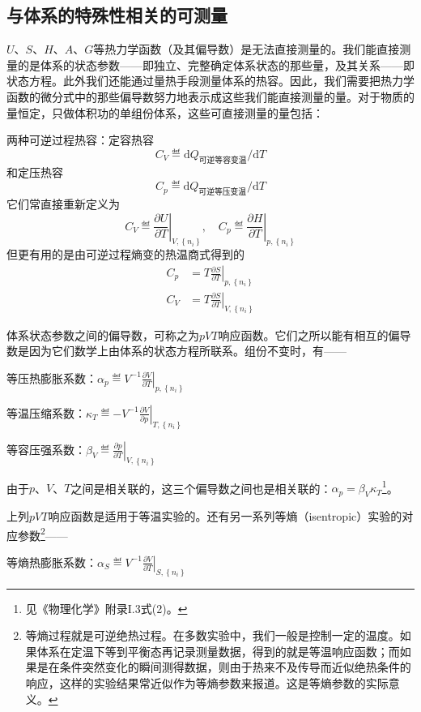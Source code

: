 \documentclass[main.tex]{subfiles}
\begin{document}
\subsection{与体系的特殊性相关的可测量}
$U$、$S$、$H$、$A$、$G$等热力学函数（及其偏导数）是无法直接测量的。我们能直接测量的是体系的状态参数——即独立、完整确定体系状态的那些量，及其关系——即状态方程。此外我们还能通过量热手段测量体系的热容。因此，我们需要把热力学函数的微分式中的那些偏导数努力地表示成这些我们能直接测量的量。对于物质的量恒定，只做体积功的单组份体系，这些可直接测量的量包括：

两种可逆过程热容：定容热容
\[C_V\eqdef\mathrm{d} Q_\text{可逆等容变温}/\mathrm{d}T\]
和定压热容
\[C_p\eqdef\mathrm{d} Q_\text{可逆等压变温}/\mathrm{d}T\]
它们常直接重新定义为
\[C_V\eqdef\left.\frac{\partial U}{\partial T}\right|_{V,\left\{n_i\right\}},\quad C_p\eqdef\left.\frac{\partial H}{\partial T}\right|_{p,\left\{n_i\right\}}\]
但更有用的是由可逆过程熵变的热温商式得到的
\begin{align}
    C_p & =T\left.\frac{\partial S}{\partial T}\right|_{p,\left\{n_i\right\}}\label{eq:I.1_heat_capacity_entropy_p} \\
    C_V & =T\left.\frac{\partial S}{\partial T}\right|_{V,\left\{n_i\right\}}\label{eq:I.1_heat_capacity_entropy_V}
\end{align}

体系状态参数之间的偏导数，可称之为$pVT$响应函数。它们之所以能有相互的偏导数是因为它们数学上由体系的状态方程所联系。组份不变时，有——

等压热膨胀系数：$\alpha_p\eqdef V^{-1}\left.\frac{\partial V}{\partial T}\right|_{p,\left\{n_i\right\}}$

等温压缩系数：$\kappa_T\eqdef-V^{-1}\left.\frac{\partial V}{\partial p}\right|_{T,\left\{n_i\right\}}$

等容压强系数：$\beta_V\eqdef\left.\frac{\partial p}{\partial T}\right|_{V,\left\{n_i\right\}}$

由于$p$、$V$、$T$之间是相关联的，这三个偏导数之间也是相关联的：$\alpha_p=\beta_V\kappa_T$\footnote{见《物理化学》附录I.3式(2)。}。

上列$pVT$响应函数是适用于等温实验的。还有另一系列等熵（isentropic）实验的对应参数\footnote{等熵过程就是可逆绝热过程。在多数实验中，我们一般是控制一定的温度。如果体系在定温下等到平衡态再记录测量数据，得到的就是等温响应函数；而如果是在条件突然变化的瞬间测得数据，则由于热来不及传导而近似绝热条件的响应，这样的实验结果常近似作为等熵参数来报道。这是等熵参数的实际意义。}——

等熵热膨胀系数：$\alpha_S\eqdef V^{-1}\left.\frac{\partial V}{\partial T}\right|_{S,\left\{n_i\right\}}$
\end{document}
